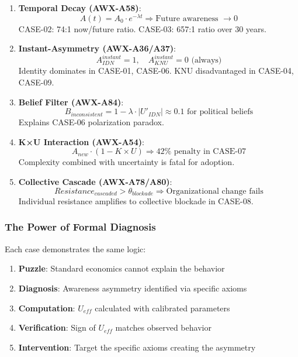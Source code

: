 \begin{enumerate}
    \item \textbf{Temporal Decay (AWX-A58)}: 
    \begin{equation}
    A(t) = A_0 \cdot e^{-\lambda t} \Rightarrow \text{Future awareness } \to 0
    \end{equation}
    CASE-02: 74:1 now/future ratio. CASE-03: 657:1 ratio over 30 years.
    
    \item \textbf{Instant-Asymmetry (AWX-A36/A37)}: 
    \begin{equation}
    A_{IDN}^{instant} = 1, \quad A_{KNU}^{instant} = 0 \text{ (always)}
    \end{equation}
    Identity dominates in CASE-01, CASE-06. KNU disadvantaged in CASE-04, CASE-09.
    
    \item \textbf{Belief Filter (AWX-A84)}:
    \begin{equation}
    B_{inconsistent} = 1 - \lambda \cdot |U'_{IDN}| \approx 0.1 \text{ for political beliefs}
    \end{equation}
    Explains CASE-06 polarization paradox.
    
    \item \textbf{K×U Interaction (AWX-A54)}:
    \begin{equation}
    A_{new} \cdot (1 - K \times U) \Rightarrow 42\% \text{ penalty in CASE-07}
    \end{equation}
    Complexity combined with uncertainty is fatal for adoption.
    
    \item \textbf{Collective Cascade (AWX-A78/A80)}:
    \begin{equation}
    Resistance_{cascaded} > \theta_{blockade} \Rightarrow \text{Organizational change fails}
    \end{equation}
    Individual resistance amplifies to collective blockade in CASE-08.
\end{enumerate}

\subsubsection{The Power of Formal Diagnosis}

Each case demonstrates the same logic:
\begin{enumerate}
    \item \textbf{Puzzle}: Standard economics cannot explain the behavior
    \item \textbf{Diagnosis}: Awareness asymmetry identified via specific axioms
    \item \textbf{Computation}: $U_{eff}$ calculated with calibrated parameters
    \item \textbf{Verification}: Sign of $U_{eff}$ matches observed behavior
    \item \textbf{Intervention}: Target the specific axioms creating the asymmetry
\end{enumerate}

